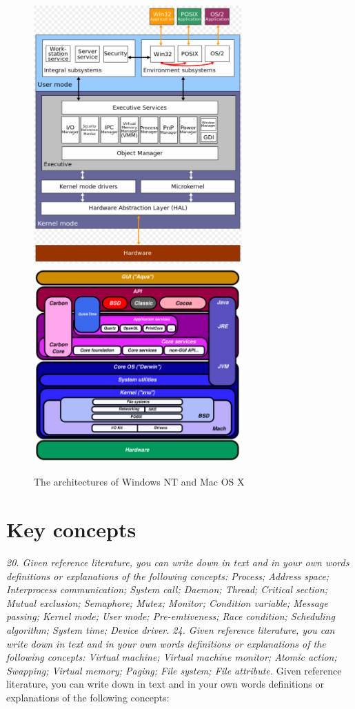 \documentclass{article}
\begin{document}
\begin{figure}[H]
  \centering
  \includegraphics[width=8.0cm]{images/windows-nt-architecture.png}
  \includegraphics[width=8.0cm]{images/mac-os-x-architecture.png}
  \caption{The architectures of Windows NT and Mac OS X}
\end{figure}



\section{Key concepts}
\emph{20. Given reference literature, you can write down in text and in your own words definitions or explanations of the following concepts: Process; Address space; Interprocess communication; System call; Daemon; Thread; Critical section; Mutual exclusion; Semaphore; Mutex; Monitor; Condition variable; Message passing; Kernel mode; User mode; Pre-emtiveness; Race condition; Scheduling algorithm; System time; Device driver.}
\emph{24. Given reference literature, you can write down in text and in your own words definitions or explanations of the following concepts: Virtual machine; Virtual machine monitor; Atomic action; Swapping; Virtual memory; Paging; File system; File attribute.}
Given reference literature, you can write down in text and in your own words definitions or explanations of the following concepts:
\end{document}

